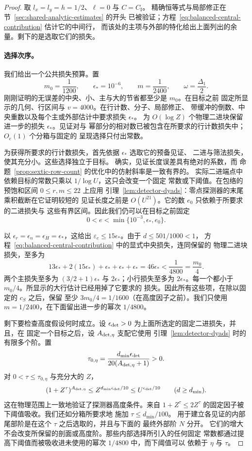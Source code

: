 \begin{proof}
取 $l_x=l_y=h=1/2$、$\ell=0$ 与 $C=C_{\mathrm I}$。
精确恒等式与局部修正在节~\ref{sec:shared-analytic-estimates} 的开头
已被验证；方程~\eqref{eq:balanced-central-contribution} 估计它的中间行，
而该处的主项与外部的特化给出上面列出的余量。剩下的是选取它们的损失。

\paragraph{选择次序。}
我们给出一个公共损失预算。置
\[
 m_0=\frac1{1200},\qquad \epsilon_*=10^{-6},\qquad
 m=\frac1{2400},\qquad \omega=\frac{\Delta_1}{2}.
\]
刚刚证明的无误差的中央、小、主与大的节省都至少是 $m_0$。在目标之前
固定所显示的几何、行区间与 $v=4000$。在行计数、分子、局部修正、
带缓冲的倒数、中央重数以及每个主或外部估计中要求损失 $\epsilon_*$。
为 $O(\log Z)$ 个物理二进块保留进一步的损失 $\epsilon_*$。见证对与
幂部分的相对数已被包含在所要求的行计数损失中；$O_e(1)$ 个分箱与固定的
呈现选择只付出常数。

为获得所要求的行计数损失，首先依据 $\epsilon_*$ 选取它的预备见证、
二进与筛法损失，使其充分小。这些选择独立于目标。
确实，见证长度误差具有绝对的系数，而
命题~\ref{prop:sextic-row-count} 的优化中的仿射斜率是一致有界的。
实际二进端点中依赖目标的常数只乘以 $1/\log U$，这只会改变一个固定
常数或下阈值。在包络的预饱和区间 $0\le r,m\le22$ 上应用
引理~\ref{lem:detector-dyads}：零点探测器的末尾乘积截断在它证明较短的
见证长度之前是 $O(U^{21})$。它的数 $e_0$ 只依赖于所要求的二进损失与
这些有界区间。因此我们仍可以在目标之前固定
\[
 0<e<\min\{10^{-3},\epsilon_*,e_0\}.
\]

以 $\epsilon_r=\epsilon_n=\epsilon_H=\epsilon_*$，这给出
$\varepsilon_c\le15\epsilon_*$。由于 $d\le501/1000<1$，
方程~\eqref{eq:balanced-central-contribution} 中的显式中央损失，连同保留的
物理二进块损失，至多为
\[
 13\epsilon_*+2(15\epsilon_*)+\epsilon_*+\epsilon_*+\epsilon_*
 =46\epsilon_*<\frac1{4800}=\frac{m_0}{4}.
\]
两个主损失至多为 $(3/2+1)\epsilon_*$ 与
$2\epsilon_*$；小行损失至多为 $2\epsilon_*$。每一个都小于
$m_0/4$。所显示的大行估计已经用掉了它要求的
损失。因此所有这些项，在除以固定的 $c_S$ 之后，保留
至少 $3m_0/4=1/1600$（在高度因子之前）。我们只使用
$m=1/2400$，在下面留出进一步的幂次 $1/4800$。

剩下要检查高度假设何时成立。设
$\epsilon_{\rm det}>0$ 为上面所选定的固定二进损失，并且，在
固定一个目标之后，设 $A_{{\rm det},\eta}$ 支配它使用
引理~\ref{lem:detector-dyads} 时的有限多个阶。置
\[
 \tau_{0,\eta}
 =\frac{d_{\min}\epsilon_{\rm det}}
        {20(A_{{\rm det},\eta}+1)}>0.
\]
对 $0<\tau\le\tau_{0,\eta}$ 与充分大的 $Z$，
\[
 (1+Z^\tau)^{A_{{\rm det},\eta}}
 \le Z^{d_{\min}\epsilon_{\rm det}/10}
 \le U^{\epsilon_{\rm det}/10}
 \qquad(d\ge d_{\min}).
\]
这在物理范围上一致地验证了探测器高度条件。来自
$1+Z^\tau\le2Z^\tau$ 的固定因子被下阈值吸收。我们还如分箱所要求地
施加 $\tau\le d_{\min}/100$。
用于建立各见证的内部尾部阶是在这个 $\tau$ 之后选取的，并且与下面的
最终外部阶 $N$ 分开。
它们的增大不会改变所保留的剖面或高度阶。那些内部选择所引入的任何固定
常数都通过提高下阈值而被吸收进未使用的幂次 $1/4800$ 中，而下阈值可以
依赖于 $\eta$ 与 $\tau$。


\end{proof}
